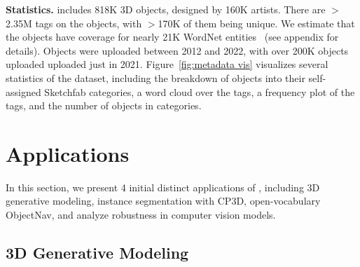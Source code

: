 \textbf{Statistics.}  includes 818K 3D objects, designed by 160K artists. There are ${>}$2.35M tags on the objects, with ${>}$170K of them being unique. We estimate that the objects have coverage for nearly 21K WordNet entities~\cite{miller1995wordnet} (see appendix for details). Objects were uploaded between 2012 and 2022, with over 200K objects uploaded uploaded just in 2021. Figure~\ref{fig:metadata vis} visualizes several statistics of the dataset, including the breakdown of objects into their self-assigned Sketchfab categories, a word cloud over the tags, a frequency plot of the tags, and the number of objects in \datalvis categories. 

\section{Applications}
\label{sec:applications}

In this section, we present 4 initial distinct applications of \data, including 3D generative modeling, instance segmentation with CP3D, open-vocabulary ObjectNav, and analyze robustness in computer vision models. %

\subsection{3D Generative Modeling}\label{sec:3d-gen-modeling}

